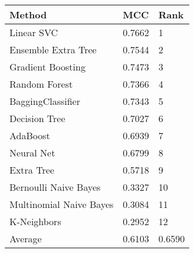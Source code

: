 \begin{tabular}{|l|l|l| }
\hline
Method                  & MCC & Rank \\ \hline
Linear SVC              & 0.7662 & 1\\
Ensemble Extra Tree     & 0.7544 & 2\\
Gradient Boosting       & 0.7473 & 3\\
Random Forest           & 0.7366 & 4\\
BaggingClassifier       & 0.7343 & 5\\
Decision Tree           & 0.7027 & 6\\
AdaBoost                & 0.6939 & 7\\
Neural Net              & 0.6799 & 8\\
Extra Tree              & 0.5718 & 9\\
Bernoulli Naive Bayes   & 0.3327 & 10\\
Multinomial Naive Bayes & 0.3084 & 11\\
K-Neighbors             & 0.2952 & 12\\
Average & 0.6103 & 0.6590 & \\
\hline
\end{tabular}